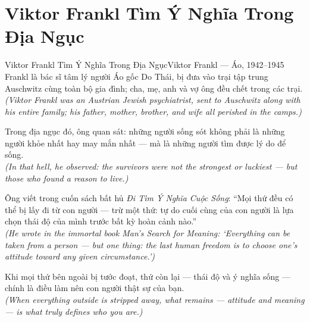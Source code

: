 \section{Viktor Frankl Tìm Ý Nghĩa Trong Địa Ngục}
\begin{truyen}{Viktor Frankl Tìm Ý Nghĩa Trong Địa Ngục}{Viktor Frankl --- Áo, 1942--1945}
 Frankl là bác sĩ tâm lý người Áo gốc Do Thái, bị đưa vào trại tập trung Auschwitz cùng toàn bộ gia đình; cha, mẹ, anh và vợ ông đều chết trong các trại.\\[4pt]
\textit{(Viktor Frankl was an Austrian Jewish psychiatrist, sent to Auschwitz along with his entire family; his father, mother, brother, and wife all perished in the camps.)}

Trong địa ngục đó, ông quan sát: những người sống sót không phải là những người khỏe nhất hay may mắn nhất --- mà là những người tìm được lý do để sống.\\[4pt]
\textit{(In that hell, he observed: the survivors were not the strongest or luckiest --- but those who found a reason to live.)}

Ông viết trong cuốn sách bất hủ \textit{Đi Tìm Ý Nghĩa Cuộc Sống}: ``Mọi thứ đều có thể bị lấy đi từ con người --- trừ một thứ: tự do cuối cùng của con người là lựa chọn thái độ của mình trước bất kỳ hoàn cảnh nào.''\\[4pt]
\textit{(He wrote in the immortal book \textit{Man's Search for Meaning}: `Everything can be taken from a person --- but one thing: the last human freedom is to choose one's attitude toward any given circumstance.')}

\end{truyen}
\begin{baihoc}
  Khi mọi thứ bên ngoài bị tước đoạt, thứ còn lại --- thái độ và ý nghĩa sống --- chính là điều làm nên con người thật sự của bạn.\\[4pt]
  \textit{(When everything outside is stripped away, what remains --- attitude and meaning --- is what truly defines who you are.)}
\end{baihoc}
